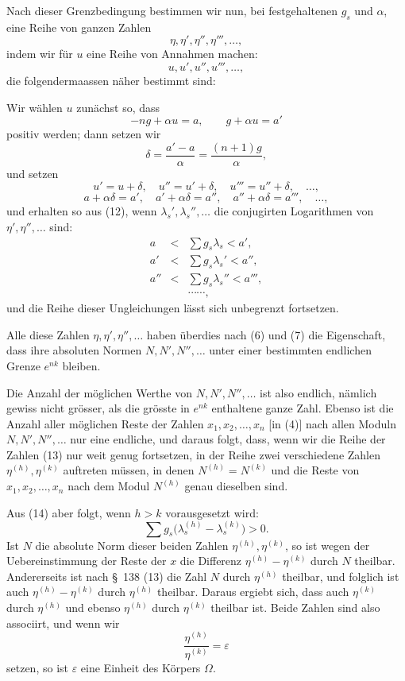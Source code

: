 \documentclass[11pt]{article}
\begin{document}
Nach dieser Grenzbedingung bestimmen wir nun, bei festgehaltenen $g_s$ und $\alpha$, eine Reihe von ganzen Zahlen
\begin{equation}
\eta,\eta',\eta'',\eta''',\ldots,
\tag{13}
\end{equation}
indem wir für $u$ eine Reihe von Annahmen machen:
\[
u,u',u'',u''',\ldots,
\]
die folgendermaassen näher bestimmt sind:

Wir wählen $u$ zunächst so, dass
\[
-ng+\alpha u=a,
\qquad
 g+\alpha u=a'
\]
positiv werden; dann setzen wir
\[
\delta=\frac{a'-a}{\alpha}=\frac{(n+1)g}{\alpha},
\]
und setzen
\[
u'=u+\delta,
\quad
u''=u'+\delta,
\quad
u'''=u''+\delta,
\quad\ldots,
\]
\[
a+\alpha\delta=a',
\quad a'+\alpha\delta=a'',
\quad a''+\alpha\delta=a''',
\quad\ldots,
\]
und erhalten so aus (12), wenn $\lambda_s',\lambda_s'',\ldots$ die conjugirten Logarithmen von $\eta',\eta'',\ldots$ sind:
\begin{equation}
\begin{array}{rcl}
a&<&\sum g_s\lambda_s<a',\\
a'&<&\sum g_s\lambda_s'<a'',\\
a''&<&\sum g_s\lambda_s''<a''',\\
&&\cdots\cdots,
\end{array}
\tag{14}
\end{equation}
und die Reihe dieser Ungleichungen lässt sich unbegrenzt fortsetzen.

Alle diese Zahlen $\eta,\eta',\eta'',\ldots$ haben überdies nach (6) und (7) die Eigenschaft, dass ihre absoluten Normen $N,N',N'',\ldots$ unter einer bestimmten endlichen Grenze $e^{nk}$ bleiben.

Die Anzahl der möglichen Werthe von $N,N',N'',\ldots$ ist also endlich, nämlich gewiss nicht grösser, als die grösste in $e^{nk}$ enthaltene ganze Zahl. Ebenso ist die Anzahl aller möglichen Reste der Zahlen $x_1,x_2,\ldots,x_n$ [in (4)] nach allen Moduln $N,N',N'',\ldots$ nur eine endliche, und daraus folgt, dass, wenn wir die Reihe der Zahlen (13) nur weit genug fortsetzen, in der Reihe zwei verschiedene Zahlen $\eta^{(h)},\eta^{(k)}$ auftreten müssen, in denen $N^{(h)}=N^{(k)}$ und die Reste von $x_1,x_2,\ldots,x_n$ nach dem Modul $N^{(h)}$ genau dieselben sind.

Aus (14) aber folgt, wenn $h>k$ vorausgesetzt wird:
\begin{equation}
\sum g_s\bigl(\lambda_s^{(h)}-\lambda_s^{(k)}\bigr)>0.
\tag{15}
\end{equation}
Ist $N$ die absolute Norm dieser beiden Zahlen $\eta^{(h)},\eta^{(k)}$, so ist wegen der Uebereinstimmung der Reste der $x$ die Differenz $\eta^{(h)}-\eta^{(k)}$ durch $N$ theilbar. Andererseits ist nach \S~138 (13) die Zahl $N$ durch $\eta^{(h)}$ theilbar, und folglich ist auch $\eta^{(h)}-\eta^{(k)}$ durch $\eta^{(h)}$ theilbar. Daraus ergiebt sich, dass auch $\eta^{(k)}$ durch $\eta^{(h)}$ und ebenso $\eta^{(h)}$ durch $\eta^{(k)}$ theilbar ist. Beide Zahlen sind also associirt, und wenn wir
\[
\frac{\eta^{(h)}}{\eta^{(k)}}=\varepsilon
\]
setzen, so ist $\varepsilon$ eine Einheit des Körpers $\Omega$.
\end{document}
